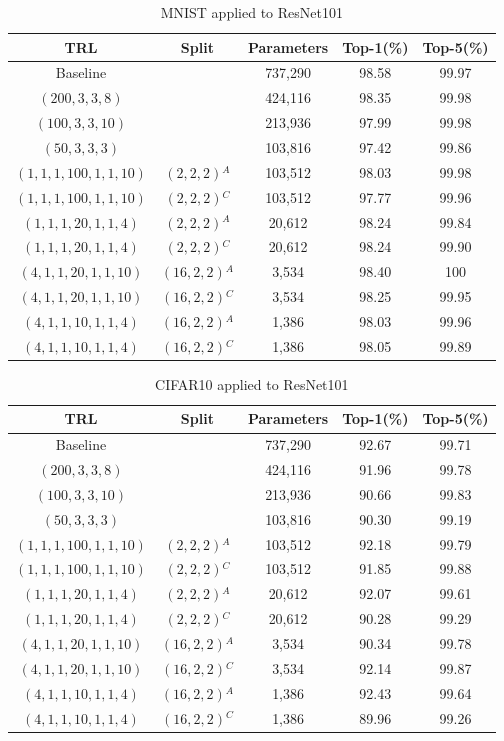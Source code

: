 \documentclass{article}
\begin{document}
\begin{table}
	\caption{MNIST applied to ResNet101}
	\label{atab-4}
	\centering
	\begin{tabular}{c c c c c}
		\toprule
		\textbf{TRL} & \textbf{Split} & \textbf{Parameters} & \textbf{Top-1(\%)} & \textbf{Top-5(\%)} \\
		\midrule
		Baseline & & 737,290 & 98.58 & 99.97 \\
		$(200,3,3,8)$ & & 424,116 & 98.35 & 99.98 \\
		$(100,3,3,10)$ & & 213,936 & 97.99 & 99.98 \\
		$(50,3,3,3)$ & & 103,816 & 97.42 & 99.86 \\
		$(1,1,1,100,1,1,10)$ & $(2,2,2)$$^A$ & 103,512 & 98.03 & 99.98 \\
		$(1,1,1,100,1,1,10)$ & $(2,2,2)$$^C$ & 103,512 & 97.77 & 99.96 \\
		$(1,1,1,20,1,1,4)$ & $(2,2,2)$$^A$ & 20,612 & 98.24 & 99.84 \\
		$(1,1,1,20,1,1,4)$ & $(2,2,2)$$^C$ & 20,612 & 98.24 & 99.90 \\
		$(4,1,1,20,1,1,10)$ & $(16,2,2)$$^A$ & 3,534 & 98.40 & 100 \\
		$(4,1,1,20,1,1,10)$ & $(16,2,2)$$^C$ & 3,534 & 98.25 & 99.95 \\
		$(4,1,1,10,1,1,4)$ & $(16,2,2)$$^A$ & 1,386 & 98.03 & 99.96 \\
		$(4,1,1,10,1,1,4)$ & $(16,2,2)$$^C$ & 1,386 & 98.05 & 99.89 \\
		\hline
	\end{tabular}
\end{table}
\begin{table}
	\caption{CIFAR10 applied to ResNet101}
	\label{atab-5}
	\centering
	\begin{tabular}{c c c c c}
		\toprule
		\textbf{TRL} & \textbf{Split} & \textbf{Parameters} & \textbf{Top-1(\%)} & \textbf{Top-5(\%)} \\
		\midrule
		Baseline & & 737,290 & 92.67 & 99.71 \\
		$(200,3,3,8)$ & & 424,116 & 91.96 & 99.78 \\
		$(100,3,3,10)$ & & 213,936 & 90.66 & 99.83 \\
		$(50,3,3,3)$ & & 103,816 & 90.30 & 99.19 \\
		$(1,1,1,100,1,1,10)$ & $(2,2,2)$$^A$ & 103,512 & 92.18 & 99.79 \\
		$(1,1,1,100,1,1,10)$ & $(2,2,2)$$^C$ & 103,512 & 91.85 & 99.88 \\
		$(1,1,1,20,1,1,4)$ & $(2,2,2)$$^A$ & 20,612 & 92.07 & 99.61 \\
		$(1,1,1,20,1,1,4)$ & $(2,2,2)$$^C$ & 20,612 & 90.28 & 99.29 \\
		$(4,1,1,20,1,1,10)$ & $(16,2,2)$$^A$ & 3,534 & 90.34 & 99.78 \\
		$(4,1,1,20,1,1,10)$ & $(16,2,2)$$^C$ & 3,534 & 92.14 & 99.87 \\
		$(4,1,1,10,1,1,4)$ & $(16,2,2)$$^A$ & 1,386 & 92.43 & 99.64 \\
		$(4,1,1,10,1,1,4)$ & $(16,2,2)$$^C$ & 1,386 & 89.96 & 99.26 \\
		\hline
	\end{tabular}
\end{table}
\end{document}
